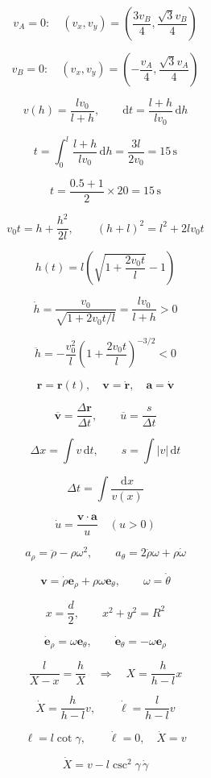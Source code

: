 \documentclass[12pt]{article}
\begin{document}
\[
v_A=0:\quad (v_x,v_y)=\left(\frac{3v_B}4,\frac{\sqrt3v_B}4\right)
\]

\[
v_B=0:\quad (v_x,v_y)=\left(-\frac{v_A}4,\frac{\sqrt3v_A}4\right)
\]

\[
v(h)=\frac{l v_0}{l+h},\qquad \mathrm dt=\frac{l+h}{l v_0}\,\mathrm dh
\]

\[
t=\int_0^l\frac{l+h}{l v_0}\,\mathrm dh =\frac{3l}{2v_0}=\boxed{15\,\mathrm s}
\]

\[
t=\frac{0.5+1}{2}\times20=\boxed{15\,\mathrm s}
\]

\[
v_0t=h+\frac{h^2}{2l},\qquad (h+l)^2=l^2+2l v_0t
\]

\[
\boxed{h(t)=l\left(\sqrt{1+\frac{2v_0t}{l}}-1\right)}
\]

\[
\dot h=\frac{v_0}{\sqrt{1+2v_0t/l}} =\frac{l v_0}{l+h}>0
\]

\[
\ddot h=-\frac{v_0^2}{l} \left(1+\frac{2v_0t}{l}\right)^{-3/2}<0
\]

\[
\boldsymbol r=\boldsymbol r(t),\quad \boldsymbol v=\dot{\boldsymbol r},\quad \boldsymbol a=\dot{\boldsymbol v}
\]

\[
\overline{\boldsymbol v}=\frac{\Delta\boldsymbol r}{\Delta t}, \qquad\overline u=\frac s{\Delta t}
\]

\[
\Delta x=\int v\,\mathrm dt,\qquad s=\int|v|\,\mathrm dt
\]

\[
\Delta t=\int\frac{\mathrm dx}{v(x)}
\]

\[
\dot u=\frac{\boldsymbol v\cdot\boldsymbol a}{u}\quad(u>0)
\]

\[
a_\rho=\ddot\rho-\rho\omega^2,\qquad a_\theta=2\dot\rho\omega+\rho\dot\omega
\]

\[
\boldsymbol v=\dot\rho\boldsymbol e_\rho+ \rho\omega\boldsymbol e_\theta,\qquad\omega=\dot\theta
\]

\[
x=\frac d2,\qquad x^2+y^2=R^2
\]

\[
\dot{\boldsymbol e}_\rho=\omega\boldsymbol e_\theta, \qquad\dot{\boldsymbol e}_\theta=-\omega\boldsymbol e_\rho
\]

\[
\frac{l}{X-x}=\frac hX\quad\Longrightarrow\quad X=\frac h{h-l}x
\]

\[
\boxed{\dot X=\frac h{h-l}v},\qquad \boxed{\dot\ell=\frac{l}{h-l}v}
\]

\[
\ell=l\cot\gamma,\qquad \boxed{\dot\ell=0,\quad\dot X=v}
\]

\[
\dot X=v-l\csc^2\gamma\,\dot\gamma
\]
\end{document}
